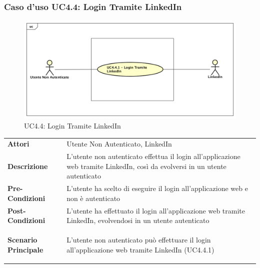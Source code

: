\subsubsection{Caso d'uso UC4.4: Login Tramite LinkedIn }
\label{UC4_4}
\begin{figure}[ht]
	\centering
	\includegraphics[scale=0.45]{UML/UC4_4.png}
	\caption{UC4.4: Login Tramite LinkedIn}
\end{figure}

\begin{longtable}{ l | p{11cm}}
	\hline
	\rowcolor{Gray}
	 \multicolumn{2}{c}{UC4.4 - Login Tramite LinkedIn} \\
	 \hline
	\textbf{Attori} & Utente Non Autenticato, LinkedIn \\
	\textbf{Descrizione} & L'utente non autenticato effettua il login all'applicazione web tramite LinkedIn, così da evolversi in un utente autenticato\\
	\textbf{Pre-Condizioni} & L'utente ha scelto di eseguire il login all'applicazione web e non è autenticato \\
	\textbf{Post-Condizioni} & L'utente ha effettuato il login all'applicazione web tramite LinkedIn, evolvendosi in un utente autenticato \\
	\textbf{Scenario Principale} & \begin{enumerate*}[label=(\arabic*.),itemjoin={\newline}]
		\item L'utente non autenticato può effettuare il login all'applicazione web tramite LinkedIn (UC4.4.1)
	\end{enumerate*}\\
\end{longtable}